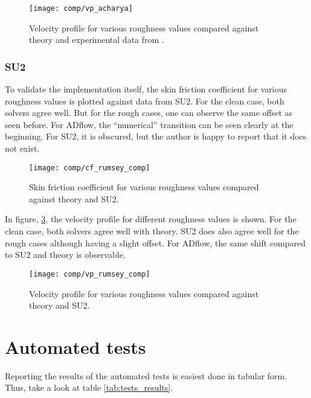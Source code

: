 \begin{figure}[H] \centering
  \texttt{[image: comp/vp\_acharya]}
    \caption{Velocity profile for various roughness values compared
      against theory and experimental data from \cite{Acharya1986}.}
    \label{fig:vp_acharya}
\end{figure}



\subsubsection{SU2}
To validate the implementation itself, the skin friction coefficient for various
roughness values is plotted against data from SU2. For the clean case, both
solvers agree well. But for the rough cases, one can observe the same offset as
seen before. For ADflow, the ``numerical'' transition can be seen clearly at the
beginning. For SU2, it is obscured, but the author is happy to report that it
does not exist.

\begin{figure}[H] \centering
  \texttt{[image: comp/cf\_rumsey\_comp]}
    \caption{Skin friction coefficient for various roughness values compared
      against theory and SU2.}
    \label{fig:cf_rumsey_comp}
\end{figure}

\noindent In figure, \ref{fig:vp_rumsey_comp}, the velocity profile for
different roughness values is shown. For the clean case, both solvers agree well
with theory. SU2 does also agree well for the rough cases although having a
slight offset. For ADflow, the same shift compared to SU2 and theory is
observable.

\begin{figure}[H] \centering
  \texttt{[image: comp/vp\_rumsey\_comp]}
    \caption{Velocity profile for various roughness values compared
      against theory and SU2.}
    \label{fig:vp_rumsey_comp}
\end{figure}





\section{Automated tests}
Reporting the results of the automated tests is easiest done in tabular form.
Thus, take a look at table \ref{tab:tests_results}.


